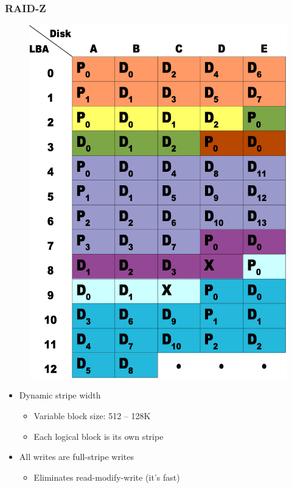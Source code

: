 % 
% 
\begin{frame}[fragile]
    \frametitle{RAID-Z}
    \begin{figure}
    \includegraphics[width=0.8\linewidth]{figs/ZFS-raidz.png}
    \end{figure}
    \begin{itemize}
        \item Dynamic stripe width
        \begin{itemize}
            \item Variable block size: 512 – 128K
            \item Each logical block is its own stripe
        \end{itemize}
        \item All writes are full-stripe writes
        \begin{itemize}
            \item Eliminates read-modify-write (it's fast)

\end{itemize}
\end{itemize}
\end{frame}
